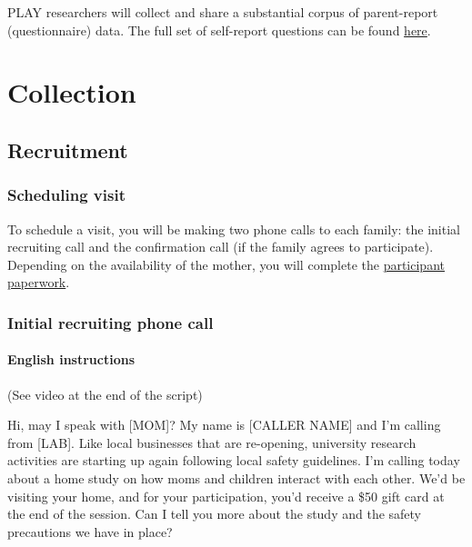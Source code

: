 \documentclass[
]{book}
\begin{document}
PLAY researchers will collect and share a substantial corpus of parent-report (questionnaire) data. The full set of self-report questions can be found \href{collection_homevisit_questionnaires.html}{here}.

\hypertarget{part-collection}{%
\part{Collection}\label{part-collection}}

\hypertarget{recruitment}{%
\chapter{Recruitment}\label{recruitment}}

\hypertarget{scheduling-visit}{%
\section{Scheduling visit}\label{scheduling-visit}}

To schedule a visit, you will be making two phone calls to each family: the initial recruiting call and the confirmation call (if the family agrees to participate). Depending on the availability of the mother, you will complete the \href{link\%20to\%20questionnaires}{participant paperwork}.

\hypertarget{initial-recruiting-phone-call}{%
\section{Initial recruiting phone call}\label{initial-recruiting-phone-call}}

\hypertarget{english_instructions}{%
\subsection*{English instructions}\label{english_instructions}}

(See video at the end of the script)

Hi, may I speak with {[}MOM{]}?
My name is {[}CALLER NAME{]} and I'm calling from {[}LAB{]}. Like local businesses that are re-opening, university research activities are starting up again following local safety guidelines. I'm calling today about a home study on how moms and children interact with each other. We'd be visiting your home, and for your participation, you'd receive a \$50 gift card at the end of the session. Can I tell you more about the study and the safety precautions we have in place?
\end{document}
